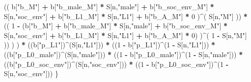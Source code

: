 \documentclass[
]{book}
\newenvironment{Shaded}{\begin{snugshade}}{\end{snugshade}}
\newcommand{\DecValTok}[1]{\textcolor[rgb]{0.00,0.00,0.81}{#1}}
\newcommand{\NormalTok}[1]{#1}
\newcommand{\SpecialCharTok}[1]{\textcolor[rgb]{0.81,0.36,0.00}{\textbf{#1}}}
\newcommand{\StringTok}[1]{\textcolor[rgb]{0.31,0.60,0.02}{#1}}
\begin{document}
\begin{Shaded}
\begin{Highlighting}[]
\NormalTok{                        (( b[}\StringTok{"b\_M"}\NormalTok{] }\SpecialCharTok{+} 
\NormalTok{                             b[}\StringTok{"b\_male\_M"}\NormalTok{] }\SpecialCharTok{*}\NormalTok{ S[n,}\StringTok{"male"}\NormalTok{] }\SpecialCharTok{+} 
\NormalTok{                             b[}\StringTok{"b\_soc\_env\_M"}\NormalTok{] }\SpecialCharTok{*}\NormalTok{ S[n,}\StringTok{"soc\_env"}\NormalTok{] }\SpecialCharTok{+} 
\NormalTok{                             b[}\StringTok{"b\_L1\_M"}\NormalTok{] }\SpecialCharTok{*}\NormalTok{ S[n,}\StringTok{"L1"}\NormalTok{] }\SpecialCharTok{+}
\NormalTok{                             b[}\StringTok{"b\_A\_M"}\NormalTok{] }\SpecialCharTok{*} \DecValTok{0}\NormalTok{ )}\SpecialCharTok{\^{}}\NormalTok{( S[n,}\StringTok{"M"}\NormalTok{] )) }\SpecialCharTok{*}
\NormalTok{                        (( }\DecValTok{1} \SpecialCharTok{{-}}\NormalTok{ (b[}\StringTok{"b\_M"}\NormalTok{] }\SpecialCharTok{+} 
\NormalTok{                                  b[}\StringTok{"b\_male\_M"}\NormalTok{] }\SpecialCharTok{*}\NormalTok{ S[n,}\StringTok{"male"}\NormalTok{] }\SpecialCharTok{+} 
\NormalTok{                                  b[}\StringTok{"b\_soc\_env\_M"}\NormalTok{] }\SpecialCharTok{*}\NormalTok{ S[n,}\StringTok{"soc\_env"}\NormalTok{] }\SpecialCharTok{+} 
\NormalTok{                                  b[}\StringTok{"b\_L1\_M"}\NormalTok{] }\SpecialCharTok{*}\NormalTok{ S[n,}\StringTok{"L1"}\NormalTok{] }\SpecialCharTok{+}
\NormalTok{                                  b[}\StringTok{"b\_A\_M"}\NormalTok{] }\SpecialCharTok{*} \DecValTok{0}\NormalTok{) )}\SpecialCharTok{\^{}}\NormalTok{( }\DecValTok{1} \SpecialCharTok{{-}}\NormalTok{ S[n,}\StringTok{"M"}\NormalTok{] )) ) ) }\SpecialCharTok{*}
\NormalTok{    ((b[}\StringTok{"p\_L1"}\NormalTok{])}\SpecialCharTok{\^{}}\NormalTok{(S[n,}\StringTok{"L1"}\NormalTok{])) }\SpecialCharTok{*}
\NormalTok{    ((}\DecValTok{1} \SpecialCharTok{{-}}\NormalTok{ b[}\StringTok{"p\_L1"}\NormalTok{])}\SpecialCharTok{\^{}}\NormalTok{(}\DecValTok{1} \SpecialCharTok{{-}}\NormalTok{ S[n,}\StringTok{"L1"}\NormalTok{])) }\SpecialCharTok{*}
\NormalTok{    ((b[}\StringTok{"p\_L0\_male"}\NormalTok{])}\SpecialCharTok{\^{}}\NormalTok{(S[n,}\StringTok{"male"}\NormalTok{])) }\SpecialCharTok{*} 
\NormalTok{    ((}\DecValTok{1} \SpecialCharTok{{-}}\NormalTok{ b[}\StringTok{"p\_L0\_male"}\NormalTok{])}\SpecialCharTok{\^{}}\NormalTok{(}\DecValTok{1} \SpecialCharTok{{-}}\NormalTok{ S[n,}\StringTok{"male"}\NormalTok{])) }\SpecialCharTok{*} 
\NormalTok{    ((b[}\StringTok{"p\_L0\_soc\_env"}\NormalTok{])}\SpecialCharTok{\^{}}\NormalTok{(S[n,}\StringTok{"soc\_env"}\NormalTok{])) }\SpecialCharTok{*}
\NormalTok{    ((}\DecValTok{1} \SpecialCharTok{{-}}\NormalTok{ b[}\StringTok{"p\_L0\_soc\_env"}\NormalTok{])}\SpecialCharTok{\^{}}\NormalTok{(}\DecValTok{1} \SpecialCharTok{{-}}\NormalTok{ S[n,}\StringTok{"soc\_env"}\NormalTok{])) }
\NormalTok{\}}


\end{Highlighting}
\end{Shaded}
\end{document}
